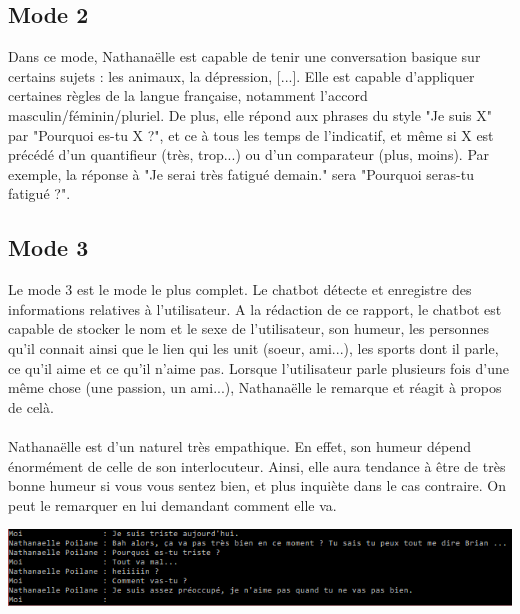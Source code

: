 \documentclass[paper=a4, fontsize=11pt]{article}
\begin{document}
\subsection{Mode 2}

Dans ce mode, Nathanaëlle est capable de tenir une conversation basique sur certains sujets : les animaux, la dépression, [...]. Elle est capable d'appliquer certaines règles de la langue française, notamment l'accord masculin/féminin/pluriel. De plus, elle répond aux phrases du style "Je suis X" par "Pourquoi es-tu X ?", et ce à tous les temps de l'indicatif, et même si X est précédé d'un quantifieur (très, trop...) ou d'un comparateur (plus, moins). Par exemple, la réponse à "Je serai très fatigué demain." sera "Pourquoi seras-tu fatigué ?".

\subsection{Mode 3}

Le mode 3 est le mode le plus complet. Le chatbot détecte et enregistre des informations relatives à l'utilisateur. A la rédaction de ce rapport, le chatbot est capable de stocker le nom et le sexe de l'utilisateur, son humeur, les personnes qu'il connait ainsi que le lien qui les unit (soeur, ami...), les sports dont il parle, ce qu'il aime et ce qu'il n'aime pas. Lorsque l'utilisateur parle plusieurs fois d'une même chose (une passion, un ami...), Nathanaëlle le remarque et réagit à propos de celà.
\begin{center}
\end{center}
\paragraph{} Nathanaëlle est d'un naturel très empathique. En effet, son humeur dépend énormément de celle de son interlocuteur. Ainsi, elle aura tendance à être de très bonne humeur si vous vous sentez bien, et plus inquiète dans le cas contraire. On peut le remarquer en lui demandant comment elle va.
\begin{center}
\includegraphics{empathie.PNG} 
\end{center}
\end{document}
